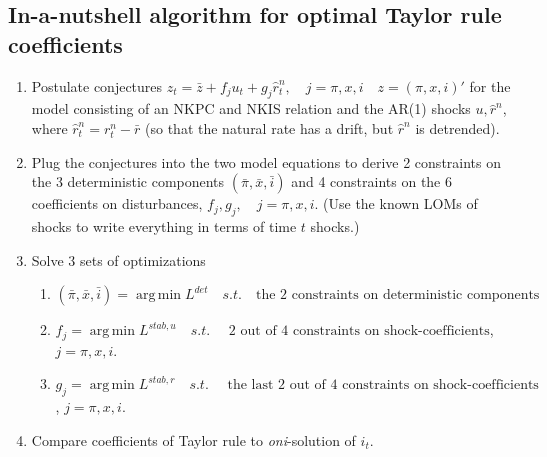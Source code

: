 \documentclass[11pt]{article}
\renewcommand{\[}{\begin{equation}}
\renewcommand{\]}{\end{equation}}
\DeclareMathOperator{\argmin}{arg\,min}
\begin{document}
\subsection{In-a-nutshell algorithm for optimal Taylor rule coefficients}
\begin{enumerate}
\item Postulate conjectures $z_t = \bar{z} +f_ju_t + g_j \hat{r}_t^n, \quad j=\pi,x,i \quad z=(\pi,x,i)'$ for the model consisting of an NKPC and NKIS relation and the AR(1) shocks $u, \hat{r}^n$, where $\hat{r}_t^n = r^n_t - \bar{r}$ (so that the natural rate has a drift, but $\hat{r}^n$ is detrended).
\item Plug the conjectures into the two model equations to derive 2 constraints on the 3 deterministic components $(\bar{\pi}, \bar{x}, \bar{i})$ and 4 constraints on the 6 coefficients on disturbances, $f_j, g_j, \quad j=\pi,x,i$. (Use the known LOMs of shocks to write everything in terms of time $t$ shocks.)
\item Solve 3 sets of optimizations
\begin{enumerate}
\item $(\bar{\pi}, \bar{x}, \bar{i}) = \argmin L^{det} \quad s.t.\quad  \text{the 2 constraints on deterministic components}$
\item $f_j = \argmin L^{stab,u} \quad s.t.\quad  \text{ 2 out of 4 constraints on shock-coefficients}$, $j=\pi,x,i$. 
\item $g_j = \argmin L^{stab,r} \quad s.t.\quad  \text{ the last 2 out of 4 constraints on shock-coefficients}$, $j=\pi,x,i$. 
\end{enumerate}
\item Compare coefficients of Taylor rule to \emph{oni}-solution of $i_t$.
\end{enumerate}
\end{document}
